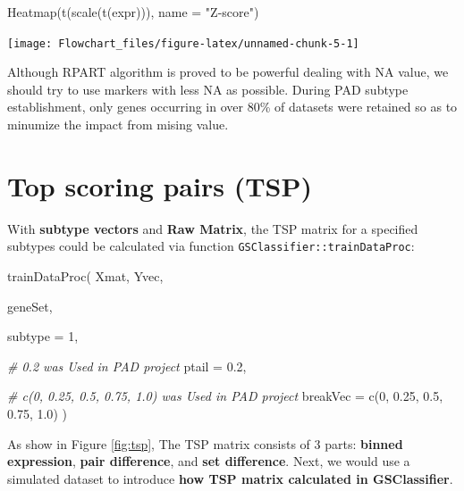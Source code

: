 \documentclass[
  12pt,
]{book}
\newenvironment{Shaded}{\begin{snugshade}}{\end{snugshade}}
\newcommand{\AttributeTok}[1]{\textcolor[rgb]{0.77,0.63,0.00}{#1}}
\newcommand{\CommentTok}[1]{\textcolor[rgb]{0.56,0.35,0.01}{\textit{#1}}}
\newcommand{\DecValTok}[1]{\textcolor[rgb]{0.00,0.00,0.81}{#1}}
\newcommand{\FloatTok}[1]{\textcolor[rgb]{0.00,0.00,0.81}{#1}}
\newcommand{\FunctionTok}[1]{\textcolor[rgb]{0.00,0.00,0.00}{#1}}
\newcommand{\NormalTok}[1]{#1}
\newcommand{\StringTok}[1]{\textcolor[rgb]{0.31,0.60,0.02}{#1}}
\begin{document}
\begin{Shaded}
\begin{Highlighting}[]
\FunctionTok{Heatmap}\NormalTok{(}\FunctionTok{t}\NormalTok{(}\FunctionTok{scale}\NormalTok{(}\FunctionTok{t}\NormalTok{(expr))), }\AttributeTok{name =} \StringTok{"Z{-}score"}\NormalTok{)}
\end{Highlighting}
\end{Shaded}

\begin{center}\texttt{[image: Flowchart\_files/figure-latex/unnamed-chunk-5-1]} \end{center}

Although RPART algorithm is proved to be powerful dealing with NA value, we should try to use markers with less NA as possible. During PAD subtype establishment, only genes occurring in over 80\% of datasets were retained so as to minumize the impact from mising value.

\hypertarget{topicTSP}{%
\section{Top scoring pairs (TSP)}\label{topicTSP}}

With \textbf{subtype vectors} and \textbf{Raw Matrix}, the TSP matrix for a specified subtypes could be calculated via function \texttt{GSClassifier::trainDataProc}:

\begin{Shaded}
\begin{Highlighting}[]
\FunctionTok{trainDataProc}\NormalTok{(}
\NormalTok{  Xmat, Yvec,}
  
\NormalTok{  geneSet, }

  \AttributeTok{subtype =} \DecValTok{1}\NormalTok{, }
  
  \CommentTok{\# 0.2 was Used in PAD project}
  \AttributeTok{ptail =} \FloatTok{0.2}\NormalTok{,}
  
  \CommentTok{\# c(0, 0.25, 0.5, 0.75, 1.0) was Used in PAD project}
  \AttributeTok{breakVec =} \FunctionTok{c}\NormalTok{(}\DecValTok{0}\NormalTok{, }\FloatTok{0.25}\NormalTok{, }\FloatTok{0.5}\NormalTok{, }\FloatTok{0.75}\NormalTok{, }\FloatTok{1.0}\NormalTok{)}
\NormalTok{)}
\end{Highlighting}
\end{Shaded}

As show in Figure \ref{fig:tsp}, The TSP matrix consists of 3 parts: \textbf{binned expression}, \textbf{pair difference}, and \textbf{set difference}. Next, we would use a simulated dataset to introduce \textbf{how TSP matrix calculated in GSClassifier}.
\end{document}
